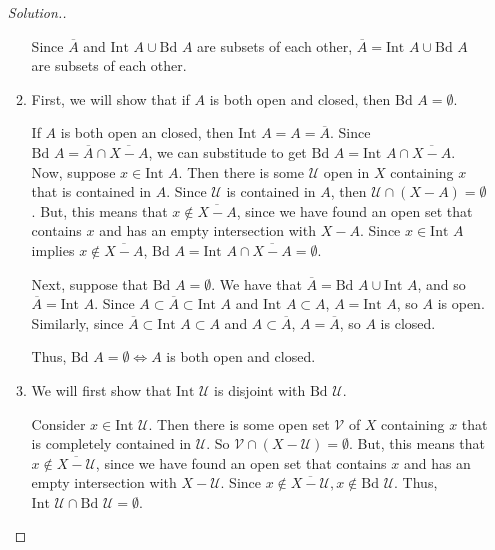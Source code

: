 \documentclass{article}
\newcommand{\U}{\mathcal{U}}
\newcommand{\V}{\mathcal{V}}
\newcommand{\sk}{\smallskip}
\begin{document}
\begin{enumerate}
\begin{proof}[Solution.]
\begin{enumerate}
            \sk

            Since $\overline{A}$ and $\text{Int }A \cup \text{Bd }A$ are subsets of each other, $\overline{A} = \text{Int }A \cup \text{Bd }A$ are subsets of each other.

            \item First, we will show that if $A$ is both open and closed, then $\text{Bd }A = \emptyset$. 

            \sk 

            If $A$ is both open an closed, then $\text{Int }A = A = \overline{A}$. Since $\text{Bd }A = \overline{A} \cap \overline{X - A}$, we can substitude to get $\text{Bd }A = \text{Int }A \cap \overline{X - A}$. Now, suppose $x \in \text{Int }A$. Then there is some $\U$ open in $X$ containing $x$ that is contained in $A$. Since $\U$ is contained in $A$, then $\U \cap (X - A) = \emptyset$. But, this means that $x \notin \overline{X - A}$, since we have found an open set that contains $x$ and has an empty intersection with $X - A$. Since $x \in \text{Int }A$ implies $x \notin \overline{X - A}$, $\text{Bd }A = \text{Int }A \cap \overline{X - A} = \emptyset$.

            \sk 

            Next, suppose that $\text{Bd }A = \emptyset$. We have that $\overline{A} = \text{Bd }A \cup \text{Int }A$, and so $\overline{A} = \text{Int }A$. Since $A \subset \overline{A} \subset \text{Int }A$ and $\text{Int }A \subset A$, $A = \text{Int }A$, so $A$ is open. Similarly, since $\overline{A} \subset \text{Int }A \subset A$ and $A \subset \overline{A}$, $A = \overline{A}$, so $A$ is closed. 

            \sk

            Thus, $\text{Bd }A = \emptyset \Leftrightarrow A$ is both open and closed.

            \item We will first show that $\text{Int }\U$ is disjoint with $\text{Bd }\U$. 

            \sk

            Consider $x \in \text{Int }\U$. Then there is some open set $\V$ of $X$ containing $x$ that is completely contained in $\U$. So $\V \cap (X - \U) = \emptyset$. But, this means that $x \notin \overline{X - \U}$, since we have found an open set that contains $x$ and has an empty intersection with $X - \U$. Since $x \notin \overline{X - \U}, x \notin \text{Bd }\U$. Thus, $\text{Int }\U \cap \text{Bd }\U = \emptyset$. 


\end{enumerate}
\end{proof}
\end{enumerate}
\end{document}
